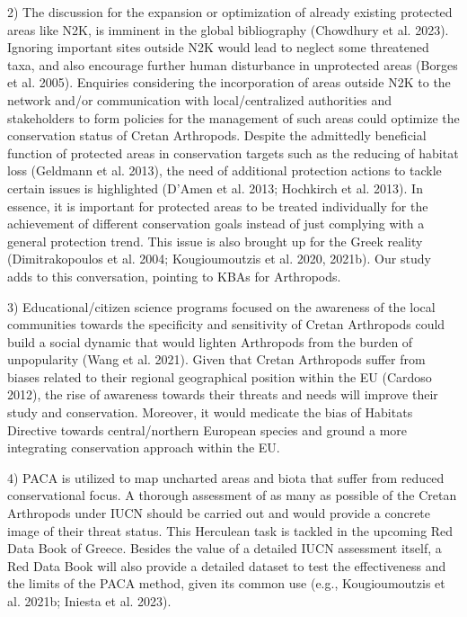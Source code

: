 2) The discussion for the expansion or optimization of already existing
protected areas like N2K, is imminent in the global bibliography (Chowdhury et al. 2023).
Ignoring important sites outside N2K would lead to neglect some threatened taxa,
and also encourage further human disturbance in unprotected areas (Borges et al. 2005).
Enquiries considering the incorporation of areas outside N2K to the network
and/or communication with local/centralized authorities and stakeholders to
form policies for the management of such areas could optimize the conservation
status of Cretan Arthropods. Despite the admittedly beneficial function of
protected areas in conservation targets such as the reducing of habitat loss (Geldmann et al. 2013),
the need of additional protection actions to tackle certain issues is highlighted (D’Amen et al. 2013; Hochkirch et al. 2013).
In essence, it is important for protected areas to be treated individually for
the achievement of different conservation goals instead of just complying with
a general protection trend. This issue is also brought up for the Greek reality (Dimitrakopoulos et al. 2004; Kougioumoutzis et al. 2020, 2021b).
Our study adds to this conversation, pointing to KBAs for Arthropods.

3) Educational/citizen science programs focused on the awareness of the local
communities towards the specificity and sensitivity of Cretan Arthropods could
build a social dynamic that would lighten Arthropods from the burden of
unpopularity (Wang et al. 2021). Given that Cretan Arthropods suffer from
biases related to their regional geographical position within the EU (Cardoso 2012),
the rise of awareness towards their threats and needs will improve their study
and conservation. Moreover, it would medicate the bias of Habitats Directive
towards central/northern European species and ground a more integrating
conservation approach within the EU.

4) PACA is utilized to map uncharted areas and biota that suffer from reduced
conservational focus. A thorough assessment of as many as possible of the
Cretan Arthropods under IUCN should be carried out and would provide a concrete
image of their threat status. This Herculean task is tackled in the upcoming
Red Data Book of Greece. Besides the value of a detailed IUCN assessment itself,
a Red Data Book will also provide a detailed dataset to test the effectiveness
and the limits of the PACA method, given its common use (e.g., Kougioumoutzis et al. 2021b; Iniesta et al. 2023).


